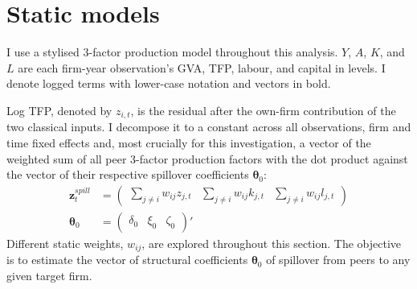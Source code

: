 \section{Static models}
\label{s:models-static}

I use a stylised 3-factor production model throughout this analysis.
$Y$, $A$, $K$, and $L$ are each firm-year observation's GVA, TFP, labour, and capital in levels.
I denote logged terms with lower-case notation and vectors in bold.
\par
Log TFP, denoted by $z_{i,t}$, is the residual after the own-firm contribution of the two classical inputs.
I decompose it to a constant across all observations, firm and time fixed effects and,
most crucially for this investigation, a vector of the weighted sum of all peer 3-factor production factors
with the dot product against the vector of their respective spillover coefficients $\boldsymbol\theta_0$:
\begin{align}
    \mathbf z_t^{spill} &= \begin{pmatrix}
        \sum_{j\neq i} w_{ij}z_{j,t} & \sum_{j\neq i} w_{ij}k_{j,t} & \sum_{j\neq i} w_{ij}l_{j,t}
    \end{pmatrix}
    \\
    \boldsymbol\theta_0 &= \begin{pmatrix}
        \delta_0 & \xi_0 & \zeta_0
    \end{pmatrix}'
\end{align}
%
Different static weights, $w_{ij}$, are explored throughout this section.
The objective is to estimate the vector of structural coefficients $\boldsymbol\theta_0$
of spillover from peers to any given target firm.
